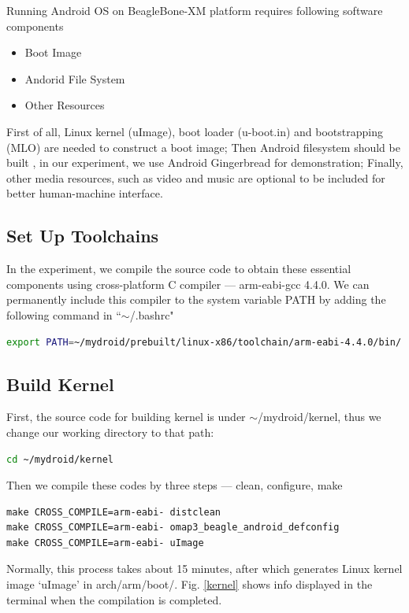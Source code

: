 \documentclass[12pt,journal,draftclsnofoot,onecolumn]{IEEEtran}
\begin{document}
Running Android OS on BeagleBone-XM platform requires following software components
\begin{itemize}
\item Boot Image
\item Andorid File System
\item Other Resources
\end{itemize}

First of all, Linux kernel (uImage), boot loader (u-boot.in) and bootstrapping (MLO)  are needed to construct a boot image; Then Android filesystem should be built , in our experiment, we use Android Gingerbread for demonstration; Finally, other media resources, such as video and music are optional to be included for better human-machine interface. 

\subsection{Set Up Toolchains}
In the experiment, we compile the source code to obtain these essential components using cross-platform C compiler --- arm-eabi-gcc 4.4.0.
We can permanently include this compiler to the system variable PATH by adding the following command in ``$\sim$/.bashrc"

\begin{lstlisting}[language={bash}]
export PATH=~/mydroid/prebuilt/linux-x86/toolchain/arm-eabi-4.4.0/bin/:$PATH
\end{lstlisting}

\subsection{Build Kernel}
First, the source code for building kernel is under $\sim$/mydroid/kernel, thus we change our working directory to that path:

\begin{lstlisting}[language={bash}]
cd ~/mydroid/kernel
\end{lstlisting}

Then we compile these codes by three steps --- clean, configure, make
\begin{lstlisting}[language={make}]
make CROSS_COMPILE=arm-eabi- distclean
make CROSS_COMPILE=arm-eabi- omap3_beagle_android_defconfig
make CROSS_COMPILE=arm-eabi- uImage
\end{lstlisting}

Normally, this process takes about 15 minutes, after which generates  Linux kernel image `uImage' in arch/arm/boot/. Fig. \ref{kernel}  shows  info displayed in the terminal when the compilation is completed.
\end{document}
